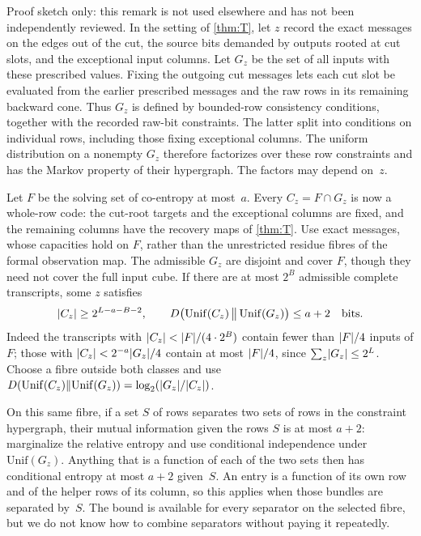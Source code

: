 \begin{remark}\label{rem:markov}
Proof sketch only: this remark is not used elsewhere and has not been independently reviewed. In the setting of
\cref{thm:T}, let $z$ record the exact messages on the edges out of the cut, the source bits demanded by outputs
rooted at cut slots, and the exceptional input columns. Let $G_z$ be the set of all inputs with these prescribed
values. Fixing the outgoing cut messages lets each cut slot be evaluated from the earlier prescribed messages
and the raw rows in its remaining backward cone. Thus $G_z$ is defined by bounded-row consistency conditions,
together with the recorded raw-bit constraints. The latter split into conditions on individual rows, including
those fixing exceptional columns. The uniform distribution on a nonempty $G_z$ therefore factorizes over these
row constraints and has the Markov property of their hypergraph. The factors may depend on~$z$.

Let $F$ be the solving set of co-entropy at most~$a$. Every $C_z=F\cap G_z$ is now a whole-row code: the cut-root
targets and the exceptional columns are fixed, and the remaining columns have the recovery maps of \cref{thm:T}.
Use exact messages, whose capacities hold on $F$, rather than the unrestricted residue fibres of the formal
observation map. The admissible $G_z$ are disjoint and cover $F$, though they need not cover the full input cube.
If there are at most $2^B$ admissible complete transcripts, some $z$ satisfies
\[
 \lvert C_z \rvert\ge 2^{L-a-B-2},\qquad
 D\bigl(\mathrm{Unif}(C_z)\,\big\|\,\mathrm{Unif}(G_z)\bigr)\le a+2\quad\text{bits}.
\]
Indeed the transcripts with $\lvert C_z \rvert<\lvert F \rvert/(4\cdot2^B)$ contain fewer than $\lvert F \rvert/4$ inputs of $F$;
those with $\lvert C_z \rvert<2^{-a}\lvert G_z \rvert/4$ contain at most $\lvert F \rvert/4$, since
$\sum_z\lvert G_z \rvert\le2^L$. Choose a fibre outside both classes and use
$D(\mathrm{Unif}(C_z)\|\mathrm{Unif}(G_z))=\log_2(\lvert G_z \rvert/\lvert C_z \rvert)$.

On this same fibre, if a set $S$ of rows separates two sets of rows in the constraint hypergraph, their mutual
information given the rows $S$ is at most $a+2$: marginalize the relative entropy and use conditional independence
under $\mathrm{Unif}(G_z)$. Anything that is a function of each of the two sets then has conditional entropy at
most $a+2$ given~$S$. An entry is a function of its own row and of the helper rows of its column, so this applies
when those bundles are separated by~$S$. The bound is available for every separator on the selected fibre, but
we do not know how to combine separators without paying it repeatedly.
\end{remark}

